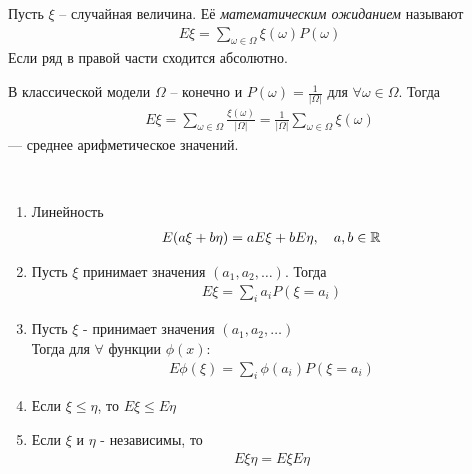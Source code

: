 \begin{definition}
	Пусть $\xi$ -- случайная величина. Её \emph{математическим ожиданием} называют 
	\begin{align*}
		E \xi = \sum_{\omega \in \Omega} \xi(\omega) P(\omega)
	\end{align*}
	Если ряд в правой части сходится абсолютно.
\end{definition}

\begin{example}
	В классической модели $\Omega$ -- конечно и $P(\omega) = 
	\frac{1}{|\Omega|}$ для $\forall \omega \in \Omega$. Тогда
	\begin{align*}
		E \xi = \sum_{\omega \in \Omega} \frac{\xi(\omega)}{|\Omega|} = 
		\frac{1}{|\Omega|} \sum\limits_{\omega \in \Omega} \xi(\omega)
	\end{align*}
	--- среднее арифметическое значений.
\end{example}

\begin{lemma}~

	\begin{enumerate}
		\item Линейность 
			\begin{align*}
				E(a \xi + b \eta) = a E \xi + b E \eta, \quad a, b \in \mathbb{R}
			\end{align*}
			
		\item Пусть $\xi$ принимает значения $(a_1, a_2, \ldots)$. Тогда
			\begin{align*}
				E \xi = \sum_i a_i P(\xi = a_i)
			\end{align*}
		
		\item Пусть $\xi$ - принимает значения $(a_1, a_2, \ldots)$\\
			Тогда для $\forall$ функции $\phi(x)$:
			\begin{align*}
				E \phi(\xi) = \sum_i \phi(a_i) P(\xi = a_i)
			\end{align*}
		
		\item Если $\xi \leq \eta$, то $E \xi \leq E \eta$
		
		\item Если $\xi$ и $\eta$ - независимы, то
			\begin{align*}
				E \xi \eta = E \xi E \eta
			\end{align*}
	\end{enumerate}
\end{lemma}

